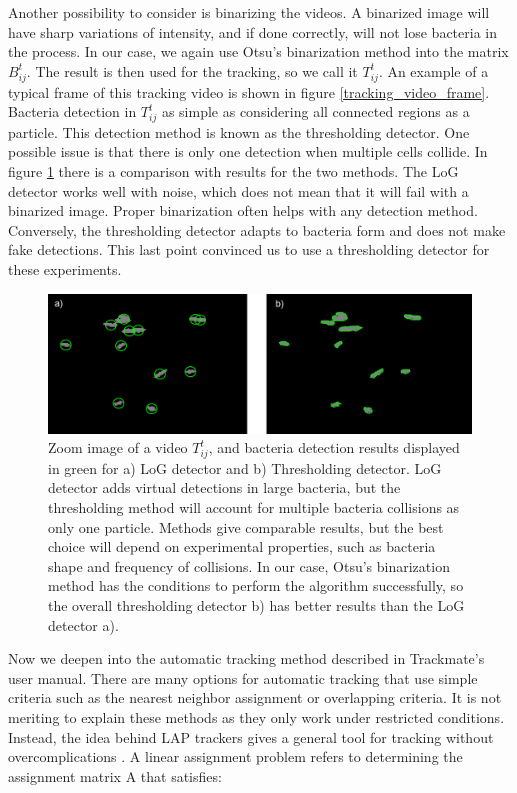 Another possibility to consider is binarizing the videos. A binarized image will have sharp variations of intensity, and if done correctly, will not lose bacteria in the process. In our case, we again use Otsu's binarization method into the matrix $B_{ij}^t$. The result is then used for the tracking, so we call it $T_{ij}^t$. An example of a typical frame of this tracking video is shown in figure \ref{tracking_video_frame}. Bacteria detection in  $T_{ij}^t$ as simple as considering all connected regions as a particle. This detection method is known as the thresholding detector. One possible issue is that there is only one detection when multiple cells collide. In figure \ref{detection_method_comparison} there is a comparison with results for the two methods. The LoG detector works well with noise, which does not mean that it will fail with a binarized image. Proper binarization often helps with any detection method. Conversely, the thresholding detector adapts to bacteria form and does not make fake detections. This last point convinced us to use a thresholding detector for these experiments.

\begin{figure}
	\centering
	\includegraphics[width=\linewidth]{imagenes/detection_method_comparison.png}
	\caption[Detection method comparison]{ Zoom image of a video $T_{ij}^t$, and bacteria detection results displayed in green for a) LoG detector and b) Thresholding detector. LoG detector adds virtual detections in large bacteria, but the thresholding method will account for multiple bacteria collisions as only one particle. Methods give comparable results, but the best choice will depend on experimental properties, such as bacteria shape and frequency of collisions. In our case, Otsu's binarization method has the conditions to perform the algorithm successfully, so the overall thresholding detector b) has better results than the LoG detector a). }
	\label{detection_method_comparison}
\end{figure}

Now we deepen into the automatic tracking method described in Trackmate's user manual. There are many options for automatic tracking that use simple criteria such as the nearest neighbor assignment or overlapping criteria. It is not meriting to explain these methods as they only work under restricted conditions. Instead, the idea behind LAP trackers gives a general tool for tracking without overcomplications \cite{Jaqaman2008RobustSequences}. A linear assignment problem refers to determining the assignment matrix A that satisfies:

